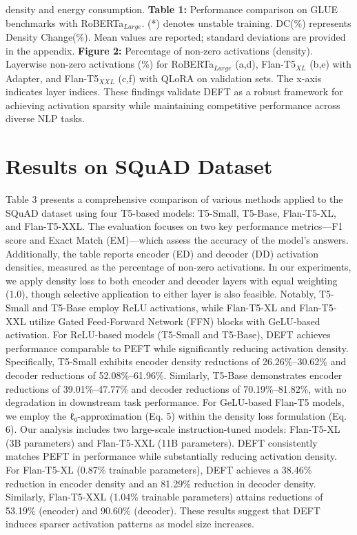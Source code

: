 \documentclass[10pt,twocolumn]{article}
\begin{document}
density and energy consumption. \textbf{Table 1:} Performance comparison on GLUE benchmarks with RoBERTa\(_{Large}\). (*) denotes unstable training. DC(\%) represents Density Change(\%). Mean values are reported; standard deviations are provided in the appendix. \textbf{Figure 2:} Percentage of non-zero activations (density). Layerwise non-zero activations (\%) for RoBERTa\(_{Large}\) (a,d), Flan-T5\(_{XL}\) (b,e) with Adapter, and Flan-T5\(_{XXL}\) (c,f) with QLoRA on validation sets. The x-axis indicates layer indices. These findings validate DEFT as a robust framework for achieving activation sparsity while maintaining competitive performance across diverse NLP tasks.




\section{Results on SQuAD Dataset}

Table 3 presents a comprehensive comparison of various methods applied to the SQuAD dataset using four T5-based models: T5-Small, T5-Base, Flan-T5-XL, and Flan-T5-XXL. The evaluation focuses on two key performance metrics—F1 score and Exact Match (EM)—which assess the accuracy of the model's answers. Additionally, the table reports encoder (ED) and decoder (DD) activation densities, measured as the percentage of non-zero activations. In our experiments, we apply density loss to both encoder and decoder layers with equal weighting (1.0), though selective application to either layer is also feasible. Notably, T5-Small and T5-Base employ ReLU activations, while Flan-T5-XL and Flan-T5-XXL utilize Gated Feed-Forward Network (FFN) blocks with GeLU-based activation. For ReLU-based models (T5-Small and T5-Base), DEFT achieves performance comparable to PEFT while significantly reducing activation density. Specifically, T5-Small exhibits encoder density reductions of 26.26\%–30.62\% and decoder reductions of 52.08\%–61.96\%. Similarly, T5-Base demonstrates encoder reductions of 39.01\%–47.77\% and decoder reductions of 70.19\%–81.82\%, with no degradation in downstream task performance. For GeLU-based Flan-T5 models, we employ the ℓ₀-approximation (Eq. 5) within the density loss formulation (Eq. 6). Our analysis includes two large-scale instruction-tuned models: Flan-T5-XL (3B parameters) and Flan-T5-XXL (11B parameters). DEFT consistently matches PEFT in performance while substantially reducing activation density. For Flan-T5-XL (0.87\% trainable parameters), DEFT achieves a 38.46\% reduction in encoder density and an 81.29\% reduction in decoder density. Similarly, Flan-T5-XXL (1.04\% trainable parameters) attains reductions of 53.19\% (encoder) and 90.60\% (decoder). These results suggest that DEFT induces sparser activation patterns as model size increases.
\end{document}
